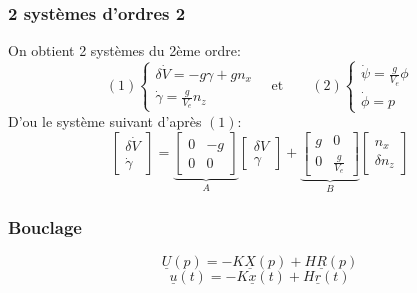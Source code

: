 \documentclass[footheight=2em]{beamer}
\begin{document}
\begin{frame}
    \frametitle{2 systèmes d'ordres 2} \pause{}
    On obtient 2 systèmes du 2ème ordre:
    \[
    (1)
    \left \{
    \begin{array}{c}
        \delta \dot{V} = -g \gamma + g n_x \\
        \dot{\gamma} = \frac{g}{V_e}n_z
    \end{array}
    \right.
    \quad \text{et} \qquad
    (2)
    \left \{
    \begin{array}{c}
        \dot{\psi} = \frac{g}{V_e} \phi \\
        \dot{\phi} = p
    \end{array}
    \right.
    \] \pause{}
    D'ou le système suivant d'après \( (1) \):
    \[
    \left[
    \begin{array}{c}
        \delta \dot{V}\\
        \dot{\gamma}
    \end{array}
    \right]
    =
    \underbrace{
        \left[
        \begin{array}{cc}
            0 & -g \\
            0 & 0
        \end{array}
        \right]
    }_{A}
    \left[
    \begin{array}{c}
        \delta V\\
        \gamma
    \end{array}
    \right]
    +
    \underbrace{
        \left[
        \begin{array}{cc}
            g & 0 \\
            0 & \frac{g}{V_e}
        \end{array}
        \right]
    }_{B}
    \left[
    \begin{array}{c}
        n_x \\
        \delta n_z
    \end{array}
    \right]
    \]
\end{frame}


\begin{frame}
    \frametitle{Bouclage} \pause{}
    \begin{center}
        
    \end{center}
    \[
    \underline{U}(p) = -K \underline{X}(p) + H \underline{R}(p)
    \]
    \[
    \underline{u}(t) = -K \underline{x}(t) + H \underline{r}(t)
    \]

\end{frame}
\end{document}
